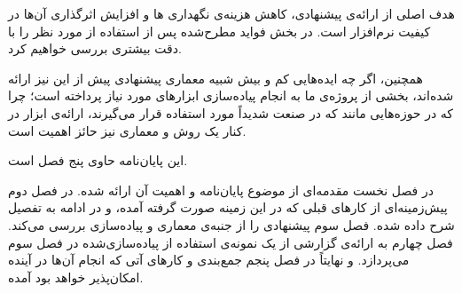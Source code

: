 هدف اصلی از ارائه‌ی   پیشنهادی، کاهش هزینه‌ی نگهداری ها و افزایش اثرگذاری آن‌ها در کیفیت نرم‌افزار است. در بخش  فواید مطرح‌شده پس از استفاده از  مورد نظر را با دقت بیشتری بررسی خواهیم کرد.

همچنین، اگر چه ایده‌هایی کم و بیش شبیه معماری پیشنهادی پیش از این نیز ارائه شده‌اند، بخشی از پروژه‌ی ما به انجام پیاده‌سازی ابزارهای مورد نیاز پرداخته است؛ چرا که در حوزه‌هایی مانند  که در صنعت شدیداً مورد استفاده قرار می‌گیرند، ارائه‌ی ابزار در کنار یک روش و معماری نیز حائز اهمیت است.


این پایان‌نامه حاوی پنج فصل است.

در فصل نخست مقدمه‌ای از موضوع پایان‌نامه و اهمیت آن ارائه شده. در فصل دوم پیش‌زمینه‌ای از کارهای قبلی که در این زمینه صورت گرفته آمده، و در ادامه  به تفصیل شرح داده شده. فصل سوم   پیشنهادی را از جنبه‌ی معماری و پیاده‌سازی بررسی می‌کند. فصل چهارم به ارائه‌ی گزارشی از یک نمونه‌ی استفاده از  پیاده‌سازی‌شده در فصل سوم می‌پردازد. و نهایتاً در فصل پنجم جمع‌بندی و کارهای آتی که انجام آن‌ها در آینده امکان‌پذیر خواهد بود آمده.

